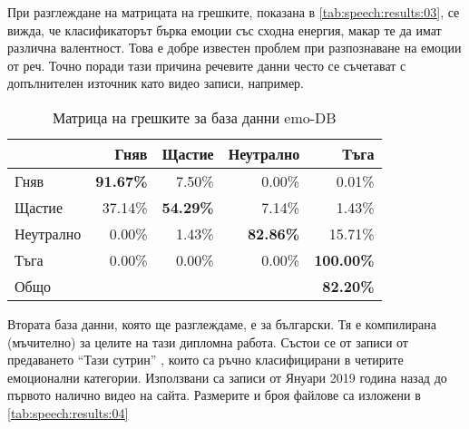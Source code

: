\documentclass[main.tex]{subfiles}
\begin{document}
При разглеждане на матрицата на грешките, показана в \autoref{tab:speech:results:03}, се вижда, че класификаторът
бърка емоции със сходна енергия, макар те да имат различна валентност. Това е добре известен проблем при разпознаване на емоции от реч. Точно поради тази причина речевите данни често се съчетават с допълнителен източник като видео записи, например. 

\begin{table}[h]
    \begin{center}
    \begin{tabular}{|l|r r r r|} 
        \hline
        & Гняв & Щастие & Неутрално & Тъга \\ 
        \hline
        Гняв &  \textbf{91.67\%} & 7.50\% & 0.00\% & 0.01\% \\ 
        Щастие & 37.14\% & \textbf{54.29\%} & 7.14\% & 1.43\% \\ 
        Неутрално & 0.00\% & 1.43\% & \textbf{82.86\%} & 15.71\% \\ 
        Тъга & 0.00\% & 0.00\% & 0.00\% & \textbf{100.00\%}\\ 
        \hline
        Общо & & & & \textbf{82.20\%}\\
        \hline
    \end{tabular}
    \caption{Матрица на грешките за база данни emo-DB}
    \label{tab:speech:results:03}
    \end{center}
\end{table}

Втората база данни, която ще разглеждаме, е за български. Тя е компилирана (мъчително) за целите на тази дипломна работа. Състои се от записи от предаването ``Тази сутрин'' \cite{tazi-sutrin}, които са ръчно класифицирани в четирите емоционални категории. Използвани са записи от Януари 2019 година назад до първото налично видео на сайта. Размерите и броя файлове са изложени в \autoref{tab:speech:results:04}
\end{document}
